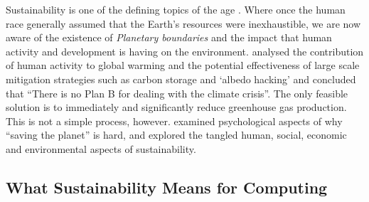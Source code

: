 Sustainability is one of the defining topics of the age \citep{Brundtland1987}. Where once the human race generally assumed that the Earth's resources were inexhaustible, we are now aware of the existence of \emph{Planetary boundaries} \citep{Steffen2015} and the impact that human activity and development is having on the environment. \citet{Pierrehumbert2019} analysed the contribution of human activity to global warming and the potential effectiveness of large scale mitigation strategies such as carbon storage and `albedo hacking' and concluded that \enquote{There is no Plan B for dealing with the climate crisis}. The only feasible solution is to immediately and significantly reduce greenhouse gas production. This is not a simple process, however. \citet{Beattie2010} examined psychological aspects of why \enquote{saving the planet} is hard, and \citet{Goodland2002} explored the tangled human, social, economic and environmental aspects of sustainability.

\subsection{What Sustainability Means for Computing}
\label{literature:computing}

